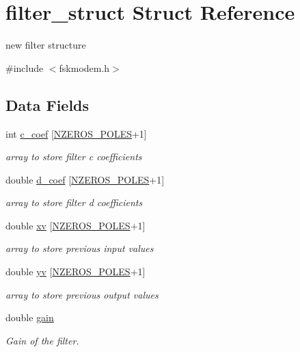 \hypertarget{structfilter__struct}{}\section{filter\+\_\+struct Struct Reference}
\label{structfilter__struct}


new filter structure  




{\ttfamily \#include $<$fskmodem.\+h$>$}

\subsection*{Data Fields}
\begin{DoxyCompactItemize}
\item 
int \hyperlink{structfilter__struct_a85747cbd60c344fc5e1e7ce15025b127}{c\+\_\+coef} \mbox{[}\hyperlink{fskmodem_8h_a3a08212b9b4c3ffb27449545dde26a2b}{N\+Z\+E\+R\+O\+S\+\_\+\+P\+O\+L\+E\+S}+1\mbox{]}
\begin{DoxyCompactList}\small\item\em array to store filter \textquotesingle{}c\textquotesingle{} coefficients \end{DoxyCompactList}\item 
double \hyperlink{structfilter__struct_a96ca838138c74e416c59b6f35b7b965c}{d\+\_\+coef} \mbox{[}\hyperlink{fskmodem_8h_a3a08212b9b4c3ffb27449545dde26a2b}{N\+Z\+E\+R\+O\+S\+\_\+\+P\+O\+L\+E\+S}+1\mbox{]}
\begin{DoxyCompactList}\small\item\em array to store filter \textquotesingle{}d\textquotesingle{} coefficients \end{DoxyCompactList}\item 
double \hyperlink{structfilter__struct_a2e543e657138b4849b87c35ad84e6cf4}{xv} \mbox{[}\hyperlink{fskmodem_8h_a3a08212b9b4c3ffb27449545dde26a2b}{N\+Z\+E\+R\+O\+S\+\_\+\+P\+O\+L\+E\+S}+1\mbox{]}
\begin{DoxyCompactList}\small\item\em array to store previous input values \end{DoxyCompactList}\item 
double \hyperlink{structfilter__struct_a37b2cc0e29d911e039c4fbd8dc7cd4b7}{yv} \mbox{[}\hyperlink{fskmodem_8h_a3a08212b9b4c3ffb27449545dde26a2b}{N\+Z\+E\+R\+O\+S\+\_\+\+P\+O\+L\+E\+S}+1\mbox{]}
\begin{DoxyCompactList}\small\item\em array to store previous output values \end{DoxyCompactList}\item 
double \hyperlink{structfilter__struct_ab8686688a862499e0cbb431206f6536d}{gain}
\begin{DoxyCompactList}\small\item\em Gain of the filter. \end{DoxyCompactList}\end{DoxyCompactItemize}


